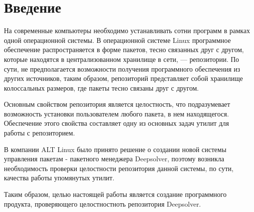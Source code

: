 \section*{Введение}
На современные компьютеры необходимо устанавливать сотни программ в рамках
одной операционной системы. В операционной системе Linux программное 
обеспечение распространяется в форме пакетов, тесно связанных друг с другом,
которые находятся в централизованном хранилище в сети, --- репозитории. По
сути, не предполагается возможности получения программного обеспечения из 
других источников, таким образом, репозиторий представляет собой хранилище 
колоссальных размеров, где пакеты тесно связаны друг с другом.

Основным свойством репозитория является целостность, что подразумевает
возможность установки пользователем любого пакета, в нем находящегося. 
Обеспечение этого свойства составляет одну из основных задач утилит для 
работы с репозиторием. 

В компании  ALT Linux было принято решение о создании новой системы
управления пакетам  - пакетного менеджера Deepsolver, поэтому возникла 
необходимость проверки целостности репозитория данной системы, по сути, 
качества работы упомянутых утилит. 

Таким образом, целью настоящей работы является создание программного 
продукта, проверяющего целостностноть репозитория Deepsolver.
